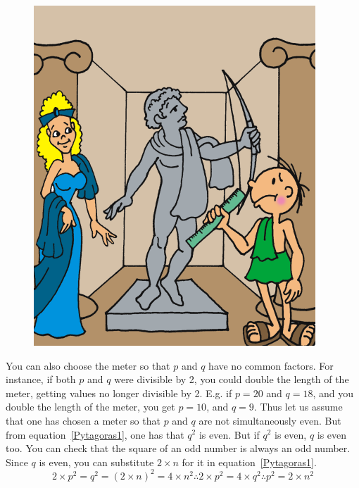 \documentclass[a4paper,12pt]{book}
\begin{document}
\begin{figure}
\includegraphics{fig-sets/apolob.png}
\end{figure}
You can also choose the meter so that $p$ and  $q$ have no common factors. For instance,
if both $p$ and $q$ were divisible by 2, you could double the length of the meter, getting
values no longer divisible by 2. E.g. if $p=20$ and $q=18$, and you double the length of
the meter, you get $p=10$, and $q=9$. Thus let us assume that one has chosen a meter so
that $p$ and $q$ are not simultaneously even. But from equation~\ref{Pytagoras1}, one
has that $q^2$ is even. But if $q^2$ is even, $q$ is even too. You can check that
the square of an odd number is always an odd number. Since $q$ is even, you can
substitute $2\times n$ for it in equation~\ref{Pytagoras1}.
\begin{equation}
2\times p^2= q^2= (2\times n)^2= 4\times n^2 \therefore 2\times p^2= 4\times q^2
\therefore p^2= 2\times n^2
\label{peven}
\end{equation}
\end{document}
